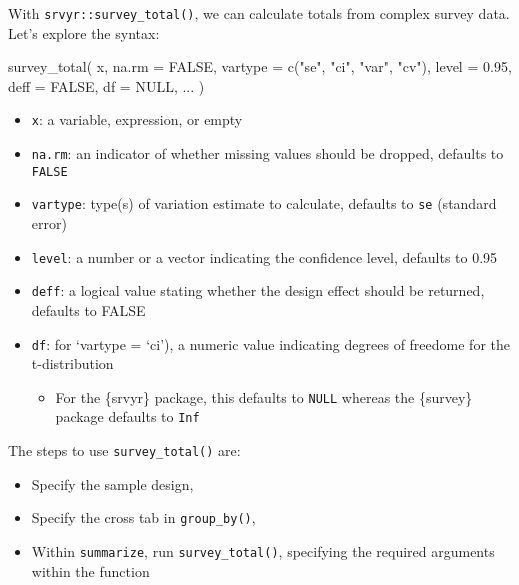 \documentclass[
]{krantz}
\makeatletter
\newenvironment{Shaded}{\begin{snugshade}}{\end{snugshade}}
\newcommand{\AttributeTok}[1]{\textcolor[rgb]{0.61,0.61,0.61}{#1}}
\newcommand{\ConstantTok}[1]{\textcolor[rgb]{0,0,0}{#1}}
\newcommand{\FloatTok}[1]{\textcolor[rgb]{0.06,0.06,0.06}{#1}}
\newcommand{\FunctionTok}[1]{\textcolor[rgb]{0,0,0}{#1}}
\newcommand{\NormalTok}[1]{#1}
\newcommand{\StringTok}[1]{\textcolor[rgb]{0.5,0.5,0.5}{#1}}
\providecommand{\tightlist}{%
  \setlength{\itemsep}{0pt}\setlength{\parskip}{0pt}}
\newenvironment{kframe}{%
\medskip{}
\setlength{\fboxsep}{.8em}
 \def\at@end@of@kframe{}%
 \ifinner\ifhmode%
  \def\at@end@of@kframe{\end{minipage}}%
  \begin{minipage}{\columnwidth}%
 \fi\fi%
 \def\FrameCommand##1{\hskip\@totalleftmargin \hskip-\fboxsep
 \colorbox{shadecolor}{##1}\hskip-\fboxsep
     \hskip-\linewidth \hskip-\@totalleftmargin \hskip\columnwidth}%
 \MakeFramed {\advance\hsize-\width
   \@totalleftmargin\z@ \linewidth\hsize
   \@setminipage}}%
 {\par\unskip\endMakeFramed%
 \at@end@of@kframe}
\renewenvironment{Shaded}{\begin{kframe}}{\end{kframe}}
\makeatother
\begin{document}
With \texttt{srvyr::survey\_total()}, we can calculate totals from complex survey data. Let's explore the syntax:

\begin{Shaded}
\begin{Highlighting}[]
\FunctionTok{survey\_total}\NormalTok{(}
\NormalTok{  x,}
  \AttributeTok{na.rm =} \ConstantTok{FALSE}\NormalTok{,}
  \AttributeTok{vartype =} \FunctionTok{c}\NormalTok{(}\StringTok{"se"}\NormalTok{, }\StringTok{"ci"}\NormalTok{, }\StringTok{"var"}\NormalTok{, }\StringTok{"cv"}\NormalTok{),}
  \AttributeTok{level =} \FloatTok{0.95}\NormalTok{,}
  \AttributeTok{deff =} \ConstantTok{FALSE}\NormalTok{,}
  \AttributeTok{df =} \ConstantTok{NULL}\NormalTok{,}
\NormalTok{  ...}
\NormalTok{)}
\end{Highlighting}
\end{Shaded}

\begin{itemize}
\tightlist
\item
  \texttt{x}: a variable, expression, or empty
\item
  \texttt{na.rm}: an indicator of whether missing values should be dropped, defaults to \texttt{FALSE}
\item
  \texttt{vartype}: type(s) of variation estimate to calculate, defaults to \texttt{se} (standard error)
\item
  \texttt{level}: a number or a vector indicating the confidence level, defaults to 0.95
\item
  \texttt{deff}: a logical value stating whether the design effect should be returned, defaults to FALSE
\item
  \texttt{df}: for `vartype = `ci'), a numeric value indicating degrees of freedome for the t-distribution

  \begin{itemize}
  \tightlist
  \item
    For the \{srvyr\} package, this defaults to \texttt{NULL} whereas the \{survey\} package defaults to \texttt{Inf}
  \end{itemize}
\end{itemize}

The steps to use \texttt{survey\_total()} are:

\begin{itemize}
\tightlist
\item
  Specify the sample design,
\item
  Specify the cross tab in \texttt{group\_by()},
\item
  Within \texttt{summarize}, run \texttt{survey\_total()}, specifying the required arguments within the function
\end{itemize}
\end{document}

